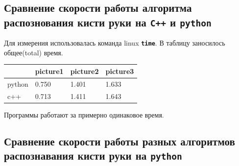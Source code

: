 \documentclass[
  12pt,
  a4paper,
]{article}
\begin{document}
\hypertarget{ux441ux440ux430ux432ux43dux435ux43dux438ux435-ux441ux43aux43eux440ux43eux441ux442ux438-ux440ux430ux431ux43eux442ux44b-ux430ux43bux433ux43eux440ux438ux442ux43cux430-ux440ux430ux441ux43fux43eux437ux43dux43eux432ux430ux43dux438ux44f-ux43aux438ux441ux442ux438-ux440ux443ux43aux438-ux43dux430-c-ux438-python}{%
\subsection{\texorpdfstring{Сравнение скорости работы алгоритма
распознования кисти руки на \textbf{\texttt{C++}} и
\textbf{\texttt{python}}}{Сравнение скорости работы алгоритма распознования кисти руки на C++ и python}}\label{ux441ux440ux430ux432ux43dux435ux43dux438ux435-ux441ux43aux43eux440ux43eux441ux442ux438-ux440ux430ux431ux43eux442ux44b-ux430ux43bux433ux43eux440ux438ux442ux43cux430-ux440ux430ux441ux43fux43eux437ux43dux43eux432ux430ux43dux438ux44f-ux43aux438ux441ux442ux438-ux440ux443ux43aux438-ux43dux430-c-ux438-python}}

Для измерения использовалась команда linux \textbf{\texttt{time}}. В
таблицу заносилось общее(total) время.

\begin{longtable}[]{@{}llll@{}}
\toprule
& picture1 & picture2 & picture3\tabularnewline
\midrule
\endhead
python & 0.750 & 1.401 & 1.633\tabularnewline
c++ & 0.713 & 1.411 & 1.643\tabularnewline
\bottomrule
\end{longtable}

Программы работают за примерно одинаковое время.

\vspace{10cm}

\hypertarget{ux441ux440ux430ux432ux43dux435ux43dux438ux435-ux441ux43aux43eux440ux43eux441ux442ux438-ux440ux430ux431ux43eux442ux44b-ux440ux430ux437ux43dux44bux445-ux430ux43bux433ux43eux440ux438ux442ux43cux43eux432-ux440ux430ux441ux43fux43eux437ux43dux430ux432ux430ux43dux438ux44f-ux43aux438ux441ux442ux438-ux440ux443ux43aux438-ux43dux430-python}{%
\subsection{\texorpdfstring{Сравнение скорости работы разных алгоритмов
распознавания кисти руки на
\textbf{\texttt{python}}}{Сравнение скорости работы разных алгоритмов распознавания кисти руки на python}}\label{ux441ux440ux430ux432ux43dux435ux43dux438ux435-ux441ux43aux43eux440ux43eux441ux442ux438-ux440ux430ux431ux43eux442ux44b-ux440ux430ux437ux43dux44bux445-ux430ux43bux433ux43eux440ux438ux442ux43cux43eux432-ux440ux430ux441ux43fux43eux437ux43dux430ux432ux430ux43dux438ux44f-ux43aux438ux441ux442ux438-ux440ux443ux43aux438-ux43dux430-python}}
\end{document}
